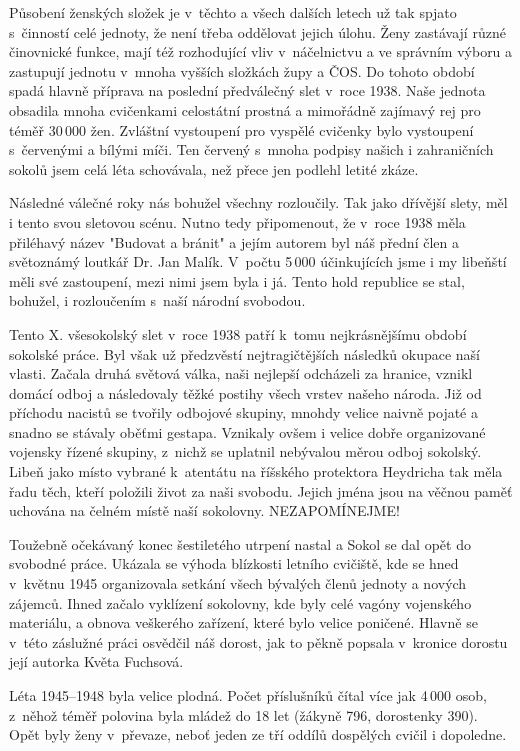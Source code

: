 \documentclass[a5paper, 11pt, twoside]{article}
\begin{document}
Působení ženských složek je v~těchto a všech dalších letech už tak
spjato s~činností celé jednoty, že není třeba oddělovat jejich úlohu.
Ženy zastávají různé činovnické funkce, mají též rozhodující vliv
v~náčelnictvu a ve správním výboru a zastupují jednotu v~mnoha vyšších
složkách župy a ČOS. Do tohoto období spadá hlavně příprava na poslední
předválečný slet v~roce 1938. Naše jednota obsadila mnoha cvičenkami
celostátní prostná a mimořádně zajímavý rej pro téměř 30\,000 žen.
Zvláštní vystoupení pro vyspělé cvičenky bylo vystoupení s~červenými a
bílými míči. Ten červený s~mnoha podpisy našich i zahraničních sokolů
jsem celá léta schovávala, než přece jen podlehl letité zkáze.

Následné válečné roky nás bohužel všechny rozloučily. Tak jako dřívější
slety, měl i tento svou sletovou scénu. Nutno tedy připomenout, že
v~roce 1938 měla přiléhavý název "Budovat a bránit" a jejím autorem byl
náš přední člen a světoznámý loutkář Dr. Jan Malík. V~počtu 5\,000
účinkujících jsme i my libeňští měli své zastoupení, mezi nimi jsem byla
i já. Tento hold republice se stal, bohužel, i rozloučením s~naší
národní svobodou.

Tento X. všesokolský slet v~roce 1938 patří k~tomu nejkrásnějšímu období
sokolské práce. Byl však už předzvěstí nejtragičtějších následků okupace
naší vlasti. Začala druhá světová válka, naši nejlepší odcházeli za
hranice, vznikl domácí odboj a následovaly těžké postihy všech vrstev
našeho národa. Již od příchodu nacistů se tvořily odbojové skupiny,
mnohdy velice naivně pojaté a snadno se stávaly oběťmi gestapa. Vznikaly
ovšem i velice dobře organizované vojensky řízené skupiny, z~nichž se
uplatnil nebývalou měrou odboj sokolský. Libeň jako místo vybrané
k~atentátu na říšského protektora Heydricha tak měla řadu těch, kteří
položili život za naši svobodu. Jejich jména jsou na věčnou paměť
uchována na čelném místě naší sokolovny. NEZAPOMÍNEJME!

Toužebně očekávaný konec šestiletého utrpení nastal a Sokol se dal opět
do svobodné práce. Ukázala se výhoda blízkosti letního cvičiště, kde se
hned v~květnu 1945 organizovala setkání všech bývalých členů jednoty a
nových zájemců. Ihned začalo vyklízení sokolovny, kde byly celé vagóny
vojenského materiálu, a obnova veškerého zařízení, které bylo velice
poničené. Hlavně se v~této záslužné práci osvědčil náš dorost, jak to
pěkně popsala v~kronice dorostu její autorka Květa Fuchsová.

Léta 1945--1948 byla velice plodná. Počet příslušníků čítal
více jak 4\,000 osob, z~něhož téměř polovina byla mládež do 18 let
(žákyně 796, dorostenky 390). Opět byly ženy v~převaze, neboť jeden ze
tří oddílů dospělých cvičil i dopoledne.
\end{document}

